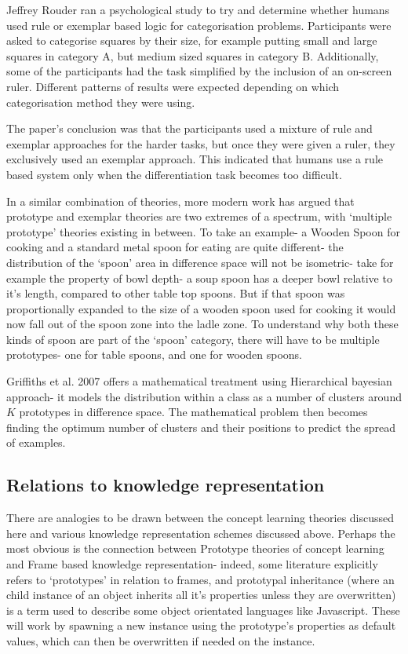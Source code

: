 \documentclass[12pt,MSc,wordcount,twoside]{muthesis}
\begin{document}
    Jeffrey Rouder \cite{rouder2006comparing} ran a psychological study to try and determine whether humans used rule or exemplar based logic for categorisation problems. Participants were asked to categorise squares by their size, for example putting small and large squares in category A, but medium sized squares in category B. Additionally, some of the participants had the task simplified by the inclusion of an on-screen ruler. Different patterns of  results were expected depending on which categorisation method they were using.
    
    The paper's conclusion was that the participants used a mixture of rule and exemplar approaches for the harder tasks, but once they were given a ruler, they exclusively used an exemplar approach. This indicated that humans use a rule based system only when the differentiation task becomes too difficult.

    In a similar combination of theories, more modern work has argued that prototype and exemplar theories are two extremes of a spectrum, with `multiple prototype' theories existing in between. To take an example- a Wooden Spoon for cooking and a standard metal spoon for eating are quite different- the distribution of the `spoon' area in difference space will not be isometric- take for example the property of bowl depth- a soup spoon has a deeper bowl relative to it's length, compared to other table top spoons. But if that spoon was proportionally expanded to the size of a wooden spoon used for cooking it would now fall out of the spoon zone into the ladle zone. To understand why both these kinds of spoon are part of the `spoon' category, there will have to be multiple prototypes- one for table spoons, and one for wooden spoons.

    Griffiths et al. 2007 \cite{griffiths2007unifying} offers a mathematical treatment using Hierarchical bayesian approach- it models the distribution within a class as a number of clusters around \(K\) prototypes in difference space. The mathematical problem then becomes finding the optimum number of clusters and their positions to predict the spread of examples.

    \subsection{Relations to knowledge representation}
    There are analogies to be drawn between the concept learning theories discussed here and various knowledge representation schemes discussed above. Perhaps the most obvious is the connection between Prototype theories of concept learning and Frame based knowledge representation- indeed, some literature explicitly refers to `prototypes' in relation to frames, and prototypal inheritance (where an child instance of an object inherits all it's properties unless they are overwritten) is a term used to describe some object orientated languages like Javascript. These will work by spawning a new instance using the prototype's properties as default values, which can then be overwritten if needed on the instance.
\end{document}
